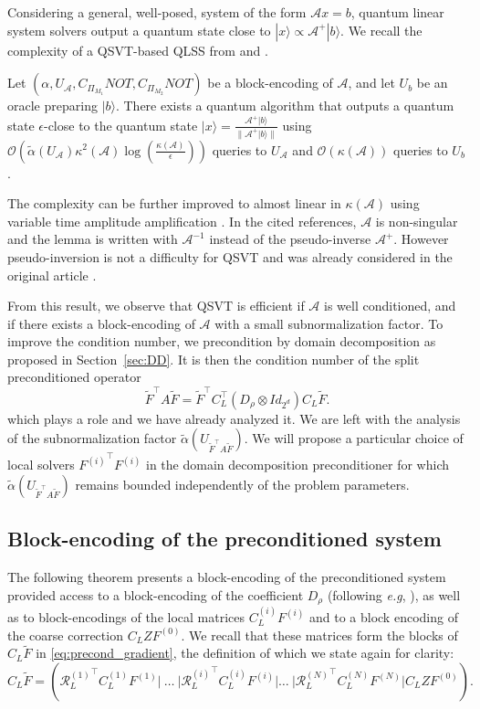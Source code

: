 \documentclass[onefignum,onetabnum]{siamart251216}
\renewcommand{\AA}{\mathcal{A}}
\newcommand{\ket}[1]{ | #1 \rangle}
\newcommand{\bigO}[1]{\mathcal{O}\left( #1 \right)}
\begin{document}
 Considering a general, well-posed, system of the form $\AA x = b$, quantum linear system solvers output a quantum state close to $\ket{x} \propto \AA^{+} \ket{b}$. We recall the complexity of a QSVT-based QLSS from  {\cite[Theorem 33]{PhysRevA.104.032422}} and {\cite[Theorem 19.3]{lin2026lecturenotes}}. 
\begin{lemma}
Let $\left( \alpha, U_\AA, C_{\Pi_{M_1}}NOT, C_{\Pi_{M_2}}NOT \right)$ be a block-encoding of $\AA$, and let $U_b$ be an oracle preparing $\ket{b}$. There exists a quantum algorithm that outputs a quantum state $\epsilon$-close to the quantum state $\ket{x} = \frac{\AA^{+} \ket{b}}{\|\AA^{+} \ket{b}\|}$ using $\bigO{\tilde{\alpha}(U_{\AA}) \kappa^2(\AA) \log\left(\frac{\kappa(\AA)}{\epsilon}\right)}$ queries to $U_\AA$ and $\bigO{\kappa(\AA)}$ queries to $U_b$.
\label{lem:qlss_qsvt}
\end{lemma}
The complexity can be further improved to almost linear in $\kappa(\mathcal A)$ using variable time amplitude amplification \cite{zbMATH06070940}. In the cited references, $\AA$ is non-singular and the lemma is written with $\AA^{-1}$ instead of the pseudo-inverse $\AA^+$. However pseudo-inversion is not a difficulty for QSVT and was already considered in the original article \cite{Gily_n_2019}. 

From this result, we observe that QSVT is efficient if $\AA$ is well conditioned, and if there exists a block-encoding of $\AA$ with a small subnormalization factor. To improve the condition number, we precondition by domain decomposition as proposed in Section~\ref{sec:DD}. It is then the condition number of the split preconditioned operator 
\[
\tilde{F}^\top A \tilde{F} = \tilde{F}^\top C_L^\top (D_{\rho} \otimes Id_{2^d}) C_L \tilde{F}.
\]
which plays a role and we have already analyzed it. We are left with the analysis of the subnormalization factor $\tilde{\alpha}(U_{\tilde{F}^\top A \tilde{F}})$.
We will propose a particular choice of local solvers ${F^{(i)}}^\top F^{(i)}$ in the domain decomposition preconditioner for which $\tilde{\alpha}(U_{\tilde{F}^\top A \tilde{F}})$ remains bounded independently of the problem parameters. 


\subsection{Block-encoding of the preconditioned system}
The following theorem presents a block-encoding of the preconditioned system provided access to a block-encoding of the coefficient $D_\rho$ (following \textit{e.g}, \cite[Proposition 3.4]{Deiml_2025}), as well as to block-encodings of the local matrices $C_L^{(i)} F^{(i)}$ and to a block encoding of the coarse correction $C_L Z F^{(0)}$. We recall that these matrices form the blocks of $C_L \tilde{F}$ in \eqref{eq:precond_gradient}, the definition of which we state again for clarity:
\[
C_L \tilde{F} = \left( {\mathcal{R}_L^{(1)}}^\top C_L^{(1)} F^{(1)}  |~\dots~| {\mathcal{R}_L^{(i)}}^\top C_L^{(i)} F^{(i)} | \dots~| {\mathcal{R}_L^{(N)}}^\top C_L^{(N)} F^{(N)} | C_L Z F^{(0)} \right).
\]
\end{document}
